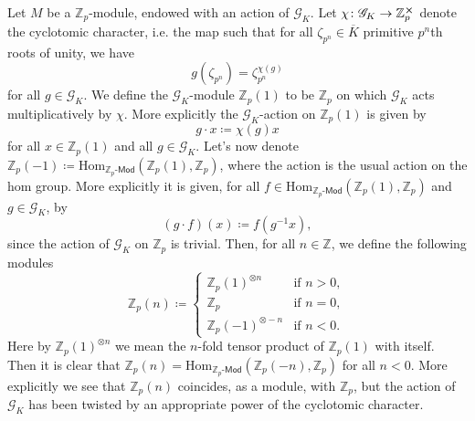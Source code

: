 \begin{ntt}[]
	Let $M$ be a $\mathbb{Z}_{p}$-module, endowed with an action of $\mathscr{G}_K$.
	Let $\chi\colon \mathscr{G}_K \to \mathbb{Z}_{p}^{\cross}$ denote the cyclotomic character,
	i.e. the map such that for all $\zeta_{p^n} \in \overline{K}$ primitive $p^n$th roots of unity,
	we have
	\begin{equation*}
		g(\zeta_{p^n}) = \zeta_{p^n}^{\chi(g)}
	\end{equation*}
	for all $g \in \mathscr{G}_K$.
	We define the $\mathscr{G}_K$-module $\mathbb{Z}_{p}(1)$ to be $\mathbb{Z}_{p}$
	on which $\mathscr{G}_K$ acts multiplicatively by $\chi$.
	More explicitly the $\mathscr{G}_K$-action on $\mathbb{Z}_{p}(1)$ is given by
	\begin{equation*}
		g \cdot x \coloneqq \chi(g) x
	\end{equation*}
	for all $x \in \mathbb{Z}_{p}(1)$ and all $g \in \mathscr{G}_K$.
	Let's now denote $\mathbb{Z}_{p}(-1) \coloneqq \mathrm{Hom}_{ \mathbb{Z}_{p}\text{-}\mathsf{Mod} }
	\left( \mathbb{Z}_{p}(1), \mathbb{Z}_{p} \right)$, where the action is the usual action on the
	hom group.
	More explicitly it is given, for all $f \in \mathrm{Hom}_{ \mathbb{Z}_{p}\text{-}\mathsf{Mod} }
	\left( \mathbb{Z}_{p}(1), \mathbb{Z}_{p} \right)$ and $g \in \mathscr{G}_K$, by
	\begin{equation*}
		(g \cdot f)(x) \coloneqq f (g^{-1} x)
	,\end{equation*}
	since the action of $\mathscr{G}_K$ on $\mathbb{Z}_{p}$ is trivial.
	Then, for all $n \in \mathbb{Z}$, we define the following modules
	\begin{equation*}
		\mathbb{Z}_{p}(n) \coloneqq
		\begin{cases}
			\mathbb{Z}_{p}(1)^{\otimes n} & \text{if } n > 0,\\
			\mathbb{Z}_{p} & \text{if } n = 0,\\
			\mathbb{Z}_{p}(-1)^{\otimes -n} & \text{if } n < 0.
		\end{cases} 
	\end{equation*}
	Here by $\mathbb{Z}_{p}(1)^{\otimes n}$ we mean the $n$-fold tensor product
	of $\mathbb{Z}_{p}(1)$ with itself.
	Then it is clear that $\mathbb{Z}_{p}(n) = \mathrm{Hom}_{ \mathbb{Z}_{p}\text{-}\mathsf{Mod} }
	\left( \mathbb{Z}_{p}(-n), \mathbb{Z}_{p} \right)$ for all $n < 0$.
	More explicitly we see that $\mathbb{Z}_{p}(n)$ coincides, as a module,
	with $\mathbb{Z}_{p}$, but the action of $\mathscr{G}_K$ has been twisted by
	an appropriate power of the cyclotomic character.

\end{ntt}
